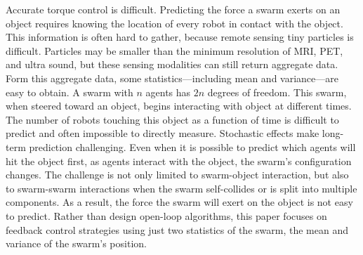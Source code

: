Accurate torque control is difficult.
Predicting the force a swarm exerts on an object requires knowing the location of every robot in contact with the object. 
This information is often hard to gather, because remote sensing tiny particles is difficult.
Particles may be smaller than the minimum resolution of MRI, PET, and ultra sound, but these sensing modalities can still return aggregate data.
Form this aggregate data,  some statistics---including mean and variance---are easy to obtain. 
A swarm with $n$ agents has $2n$ degrees of freedom.  
This swarm, when steered toward an object, begins interacting with object at different times. 
The number of robots touching this object as a function of time is difficult to predict and often impossible to directly measure.
Stochastic effects make long-term prediction challenging.
Even when it is possible to predict which agents will hit the object first, as agents interact with the object, the swarm's configuration changes.
The challenge is not only limited to swarm-object interaction, but also to swarm-swarm interactions when the swarm self-collides  or is split into multiple components. 
As a result, the force the swarm will exert on the object is not easy to predict.
Rather than design open-loop algorithms, this paper focuses on feedback control strategies using just two statistics of the swarm, the mean and variance of the swarm's position.











